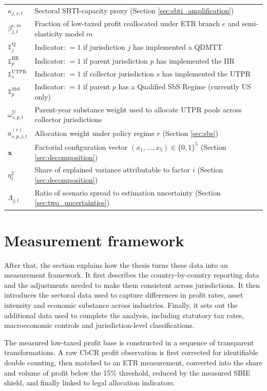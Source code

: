 \documentclass[11pt,a4paper]{article}
\begin{document}
\begin{table}[H]
\begin{tabular}{@{}ll@{}}
$\kappa_{j,s,t}$ & Sectoral SBTI-capacity proxy (Section \ref{sec:sbti_amplification}) \\
$\beta_{j,t}^{e,m}$ & Fraction of low-taxed profit reallocated under ETR branch $e$ and semi-elasticity model $m$ \\
$\mathbb{1}_j^{\text{Q}}$ & Indicator: $=1$ if jurisdiction $j$ has implemented a QDMTT \\
$\mathbb{1}_p^{\text{IIR}}$ & Indicator: $=1$ if parent jurisdiction $p$ has implemented the IIR \\
$\mathbb{1}_s^{\text{UTPR}}$ & Indicator: $=1$ if collector jurisdiction $s$ has implemented the UTPR \\
$\mathbb{1}_p^{\text{SbS}}$ & Indicator: $=1$ if parent $p$ has a Qualified SbS Regime (currently US only) \\
$\omega_{s,p,t}^{\text{U}}$ & Parent-year substance weight used to allocate UTPR pools across collector jurisdictions \\
$a_{s,p,j,t}^{(r)}$ & Allocation weight under policy regime $r$ (Section \ref{sec:sbs}) \\
$\mathbf{x}$ & Factorial configuration vector $(x_1, \ldots, x_5) \in \{0,1\}^5$ (Section \ref{sec:decomposition}) \\
$\eta_i^2$ & Share of explained variance attributable to factor $i$ (Section \ref{sec:decomposition}) \\
$\Lambda_{j,t}$ & Ratio of scenario spread to estimation uncertainty (Section \ref{sec:two_uncertainties}) \\
\bottomrule
\end{tabular}
\end{table}

\section{Measurement framework}\label{sec:measurement_framework}

After that, the section explains how the thesis turns these data into an measurement framework. It first describes the country-by-country reporting data and the adjustments needed to make them consistent across jurisdictions. It then introduces the sectoral data used to capture differences in profit rates, asset intensity and economic substance across industries. Finally, it sets out the additional data used to complete the analysis, including statutory tax rates, macroeconomic controls and jurisdiction-level classifications. 

The measured low-taxed profit base is constructed in a sequence of transparent transformations. A raw CbCR profit observation is first corrected for identifiable double counting, then matched to an ETR measurement, converted into the share and volume of profit below the 15\% threshold, reduced by the measured SBIE shield, and finally linked to legal allocation indicators. 
\end{document}
